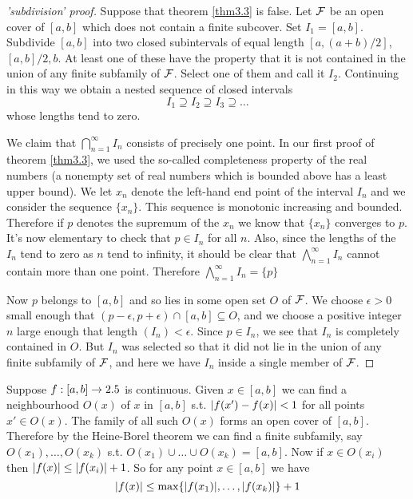 \documentclass[11pt]{article}
\begin{document}
\begin{proof}['subdivision' proof]
Suppose that theorem \ref{thm3.3}  is false. Let \(\mathcal{F}\) be an open cover of
\([a,b]\) which does not contain a finite subcover. Set \(I_1=[a,b]\).
Subdivide \([a,b]\) into two closed subintervals of equal length
\([a,(a+b)/2]\), \([a,b]/2,b\). At least one of these have the property that
it is not contained in the union of any finite subfamily of \(\mathcal{F}\). Select
one of them and call it \(I_2\).  Continuing in this way we obtain a nested
sequence of closed intervals
\begin{equation*}
I_1\supseteq I_2\supseteq I_3\supseteq\dots
\end{equation*}
whose lengths tend to zero.

We claim that \(\displaystyle\bigcap_{n=1}^\infty I_n\) consists of precisely
one point. In our first proof of theorem \ref{thm3.3}, we used the so-called
completeness property of the real numbers (a nonempty set of real numbers
which is bounded above has a least upper bound). We let \(x_n\) denote the
left-hand end point of the interval \(I_n\) and we consider the sequence
\(\{x_n\}\). This sequence is monotonic increasing and bounded. Therefore if
\(p\) denotes the supremum of the \(x_n\) we know that \(\{x_n\}\) converges
to \(p\). It's now elementary to check that \(p\in I_n\) for all \(n\). Also,
since the lengths of the \(I_n\) tend to zero as \(n\) tend to infinity, it
should be clear that \(\bigwedge_{n=1}^\infty I_n\) cannot contain more than
one point. Therefore \(\bigwedge_{n=1}^\infty I_n=\{p\}\)

Now \(p\) belongs to \([a,b]\) and so lies in some open set \(O\) of
\(\mathcal{F}\). We choose \(\epsilon>0\) small enough that
\((p-\epsilon,p+\epsilon)\cap[a,b]\subseteq O\), and we choose a positive
integer \(n\) large enough that length \((I_n)<\epsilon\). Since \(p\in
   I_n\), we see that \(I_n\) is completely contained in \(O\). But \(I_n\) was
selected so that it did not lie in the union of any finite subfamily of
\(\mathcal{F}\), and here we have \(I_n\) inside a single member of \(\mathcal{F}\).
\end{proof}

Suppose \(f:[a,b]\to2.5\) is continuous. Given \(x\in[a,b]\) we can find a
neighbourhood \(O(x)\) of \(x\) in \([a,b]\) s.t. \(\abs{f(x')-f(x)}<1\) for
all points \(x'\in O(x)\). The family of all such \(O(x)\) forms an open
cover of \([a,b]\). Therefore by the Heine-Borel theorem we can find a finite
subfamily, say \(O(x_1),\dots,O(x_k)\) s.t. \(O(x_1)\cup\dots\cup
   O(x_k)=[a,b]\). Now if \(x\in O(x_i)\) then \(\abs{f(x)}\le\abs{f(x_i)}+1\).
So for any point \(x\in[a,b]\) we have
\begin{equation*}
\abs{f(x)}\le\max\{\abs{f(x_1)},\dots,\abs{f(x_k)}\}+1
\end{equation*}
\end{document}
